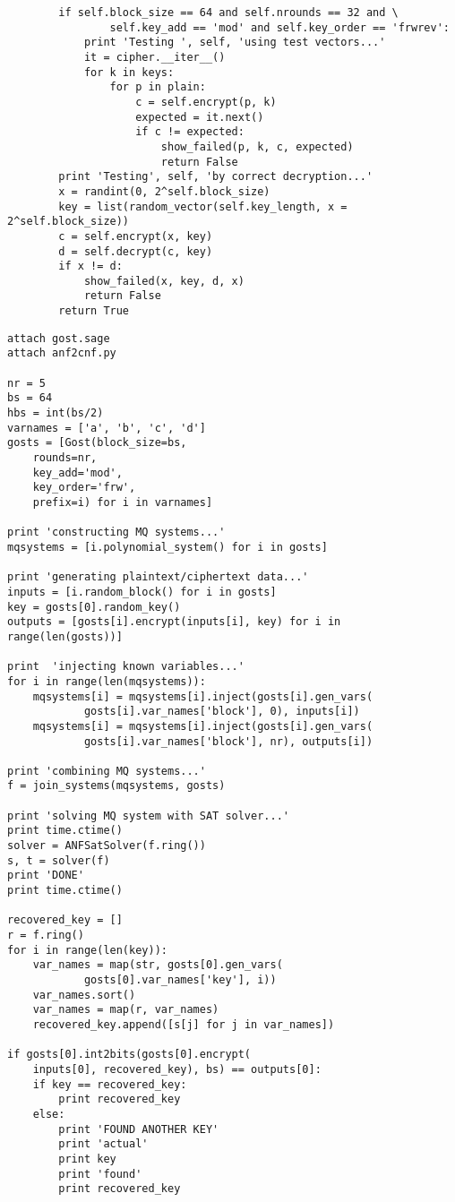 \begin{lstlisting}
        if self.block_size == 64 and self.nrounds == 32 and \
                self.key_add == 'mod' and self.key_order == 'frwrev':
            print 'Testing ', self, 'using test vectors...'
            it = cipher.__iter__()
            for k in keys:
                for p in plain:
                    c = self.encrypt(p, k)
                    expected = it.next()
                    if c != expected:
                        show_failed(p, k, c, expected)
                        return False
        print 'Testing', self, 'by correct decryption...'
        x = randint(0, 2^self.block_size)
        key = list(random_vector(self.key_length, x = 2^self.block_size))
        c = self.encrypt(x, key)
        d = self.decrypt(c, key)
        if x != d:
            show_failed(x, key, d, x)
            return False
        return True
\end{lstlisting}


\label{app:solving-sat}

\begin{lstlisting}
attach gost.sage
attach anf2cnf.py

nr = 5
bs = 64
hbs = int(bs/2)
varnames = ['a', 'b', 'c', 'd']
gosts = [Gost(block_size=bs,
    rounds=nr,
    key_add='mod',
    key_order='frw',
    prefix=i) for i in varnames]

print 'constructing MQ systems...'
mqsystems = [i.polynomial_system() for i in gosts]

print 'generating plaintext/ciphertext data...'
inputs = [i.random_block() for i in gosts]
key = gosts[0].random_key()
outputs = [gosts[i].encrypt(inputs[i], key) for i in range(len(gosts))]

print  'injecting known variables...'
for i in range(len(mqsystems)):
    mqsystems[i] = mqsystems[i].inject(gosts[i].gen_vars(
            gosts[i].var_names['block'], 0), inputs[i])
    mqsystems[i] = mqsystems[i].inject(gosts[i].gen_vars(
            gosts[i].var_names['block'], nr), outputs[i])

print 'combining MQ systems...'
f = join_systems(mqsystems, gosts)

print 'solving MQ system with SAT solver...'
print time.ctime()
solver = ANFSatSolver(f.ring())
s, t = solver(f)
print 'DONE'
print time.ctime()

recovered_key = []
r = f.ring()
for i in range(len(key)):
    var_names = map(str, gosts[0].gen_vars(
            gosts[0].var_names['key'], i))
    var_names.sort()
    var_names = map(r, var_names)
    recovered_key.append([s[j] for j in var_names])

if gosts[0].int2bits(gosts[0].encrypt(
    inputs[0], recovered_key), bs) == outputs[0]:
    if key == recovered_key:
        print recovered_key
    else:
        print 'FOUND ANOTHER KEY'
        print 'actual'
        print key
        print 'found'
        print recovered_key
\end{lstlisting}


